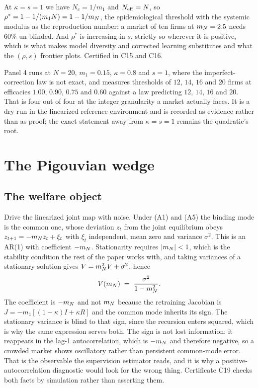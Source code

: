 At $\kappa = s = 1$ we have $N_c = 1/m_1$ and $N_{\mathrm{eff}} = N$, so $\rho^\ast = 1 - 1/(m_1N) = 1 - 1/m_N$, the epidemiological threshold with the systemic modulus as the reproduction number: a market of ten firms at $m_N = 2.5$ needs $60\%$ un-blinded. And $\rho^\ast$ is increasing in $s$, strictly so wherever it is positive, which is what makes model diversity and corrected learning substitutes and what the $(\rho,s)$ frontier plots. Certified in C15 and C16.

Panel 4 runs at $N=20$, $m_1=0.15$, $\kappa=0.8$ and $s=1$, where the imperfect-correction law is not exact, and measures thresholds of $12$, $14$, $16$ and $20$ firms at efficacies $1.00$, $0.90$, $0.75$ and $0.60$ against a law predicting $12$, $14$, $16$ and $20$. That is four out of four at the integer granularity a market actually faces. It is a dry run in the linearized reference environment and is recorded as evidence rather than as proof; the exact statement away from $\kappa = s = 1$ remains the quadratic's root.

\section{The Pigouvian wedge}
\label{app:wedge}

\subsection{The welfare object}

Drive the linearized joint map with noise. Under (A1) and (A5) the binding mode is the common one, whose deviation $z_t$ from the joint equilibrium obeys $z_{t+1} = -m_N z_t + \xi_t$ with $\xi_t$ independent, mean zero and variance $\sigma^2$. This is an AR(1) with coefficient $-m_N$. Stationarity requires $|m_N| < 1$, which is the stability condition the rest of the paper works with, and taking variances of a stationary solution gives $V = m_N^2V + \sigma^2$, hence
\[
  V(m_N) \;=\; \frac{\sigma^2}{1-m_N^2}.
\]
The coefficient is $-m_N$ and not $m_N$ because the retraining Jacobian is $J = -m_1[(1-\kappa)I+\kappa R]$ and the common mode inherits its sign. The stationary variance is blind to that sign, since the recursion enters squared, which is why the same expression serves both. The sign is not lost information: it reappears in the lag-1 autocorrelation, which is $-m_N$ and therefore negative, so a crowded market shows oscillatory rather than persistent common-mode error. That is the observable the supervision estimator reads, and it is why a positive-autocorrelation diagnostic would look for the wrong thing. Certificate C19 checks both facts by simulation rather than asserting them.

